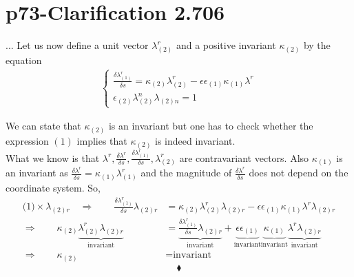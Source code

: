 \section{p73-Clarification 2.706}
\begin{tcolorbox}
... Let us now define a unit vector $\lambda^r_{(2)}$ and a positive invariant $\kappa_{(2)}$ by the equation \\
\begin{align}
\left \{ \begin{array}{c}
\frac{\delta\lambda_{(1)}^r}{\delta s} = \kappa_{(2)}\lambda^r_{(2)} - \epsilon\epsilon_{(1)}\kappa_{(1)}\lambda^r\\
\epsilon_{(2)}\lambda^n_{(2)}\lambda_{(2)n} = 1
\end{array} \right.
\end{align}  
\end{tcolorbox}
We can state that $\kappa_{(2)}$ is an invariant but one has to check whether the expression $(1)$ implies that $\kappa_{(2)}$ is indeed invariant.\\
What we know is that $\lambda^r, \frac{\delta \lambda^r}{\delta s},\frac{\delta\lambda_{(1)}^r}{\delta s},  \lambda^r_{(2)}$ are contravariant vectors. Also $\kappa_{(1)}$ is an invariant as $\frac{\delta\lambda^r}{\delta s} = \kappa_{(1)}\lambda^r_{(1)}$ and the magnitude of $\frac{\delta\lambda^r}{\delta s}$ does not depend on the coordinate system. So,
\begin{align}
\text{(1)}\times \lambda_{(2)r} \quad\Rightarrow \quad\quad \frac{\delta\lambda_{(1)}^r}{\delta s}\lambda_{(2)r} &= \kappa_{(2)}\lambda^r_{(2)}\lambda_{(2)r} - \epsilon\epsilon_{(1)}\kappa_{(1)}\lambda^r\lambda_{(2)r}\\
\Rightarrow \quad\quad \kappa_{(2)}\underbrace{\lambda^r_{(2)}\lambda_{(2)r}}_{\text{invariant}} &= \underbrace{\frac{\delta\lambda_{(1)}^r}{\delta s}\lambda_{(2)r}}_{\text{invariant}}  + \underbrace{\epsilon\epsilon_{(1)}}_{\text{invariant}} \underbrace{\kappa_{(1)}}_{\text{invariant}} \underbrace{\lambda^r \lambda_{(2)r}}_{\text{invariant}} \\
\Rightarrow \quad\quad \kappa_{(2)}&= \text{invariant} 
\end{align}
$$\blacklozenge$$
\newpage

